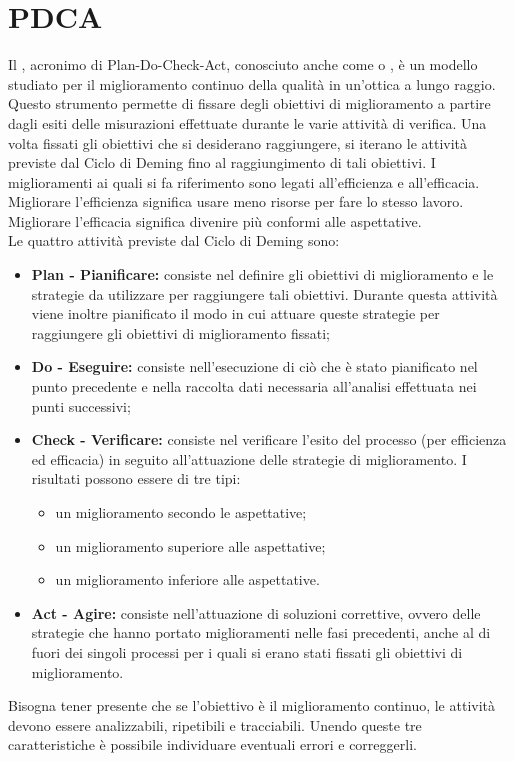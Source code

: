 \documentclass[PianoDiQualifica.tex]{subfiles}
\begin{document}
\section{PDCA}
Il , acronimo di Plan-Do-Check-Act, conosciuto anche come  o , è un modello studiato per il
miglioramento continuo della qualità in un’ottica a lungo raggio.\\ 
Questo strumento permette di fissare degli obiettivi di miglioramento a partire dagli esiti delle misurazioni effettuate durante le varie attività di verifica.
Una volta fissati gli obiettivi che si desiderano raggiungere, si iterano le attività previste dal Ciclo di Deming fino al raggiungimento di tali obiettivi.
I miglioramenti ai quali si fa riferimento sono legati all’efficienza e all’efficacia. Migliorare l’efficienza significa usare meno risorse per fare lo stesso
lavoro. Migliorare l’efficacia significa divenire più conformi alle aspettative.\\
Le quattro attività previste dal Ciclo di Deming sono:
\begin{itemize}
\item \textbf{Plan - Pianificare:} consiste nel definire gli obiettivi di miglioramento
e le strategie da utilizzare per raggiungere tali obiettivi. Durante questa
attività viene inoltre pianificato il modo in cui attuare queste strategie
per raggiungere gli obiettivi di miglioramento fissati;
\item \textbf{Do - Eseguire:} consiste nell'esecuzione di ciò che è stato pianificato nel punto precedente e nella raccolta dati necessaria all'analisi effettuata nei punti successivi;
\item \textbf{ Check - Verificare:} consiste nel verificare l’esito del processo (per
efficienza ed efficacia) in seguito all’attuazione delle strategie di miglioramento. I risultati possono essere di tre tipi:
\begin{itemize}
\item un miglioramento secondo le aspettative;
\item un miglioramento superiore alle aspettative;
\item un miglioramento inferiore alle aspettative.
\end{itemize}
\item \textbf{ Act - Agire:} consiste nell’attuazione di soluzioni correttive, ovvero delle strategie che hanno portato miglioramenti nelle fasi precedenti, anche al di fuori dei singoli processi per i quali si erano stati fissati gli obiettivi di miglioramento.
\end{itemize}

Bisogna tener presente che se l’obiettivo è il miglioramento continuo, le attività devono essere analizzabili, ripetibili e tracciabili. Unendo queste tre
caratteristiche è possibile individuare eventuali errori e correggerli.
\end{document}
